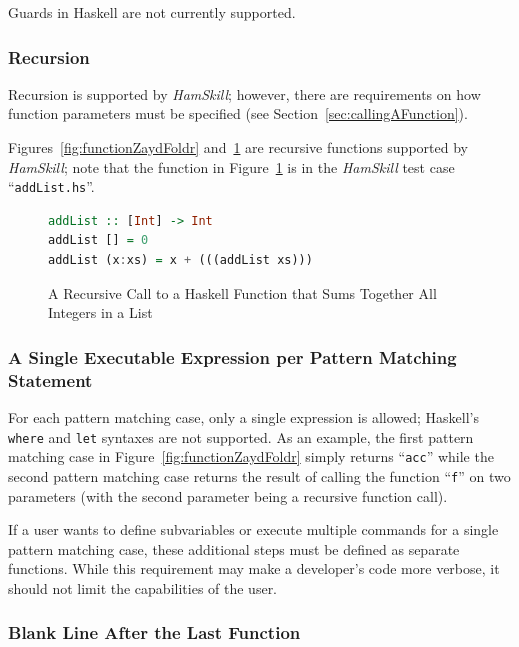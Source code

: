 \documentclass{report}
\begin{document}
Guards in Haskell are not currently supported.


\subsubsection{Recursion}

Recursion is supported by \textit{HamSkill}; however, there are requirements on how function parameters must be specified (see Section~\ref{sec:callingAFunction}).

Figures~\ref{fig:functionZaydFoldr} and~\ref{fig:functionAddList} are recursive functions supported by \textit{HamSkill}; note that the function in Figure~\ref{fig:functionAddList} is in the \textit{HamSkill} test case ``\texttt{addList.hs}''.

\begin{figure}[H]
\begin{mdframed}
\begin{lstlisting}[language=Haskell]
addList :: [Int] -> Int
addList [] = 0
addList (x:xs) = x + (((addList xs)))
\end{lstlisting}
\end{mdframed}
\caption{A Recursive Call to a Haskell Function that Sums Together All Integers in a List}\label{fig:functionAddList}
\end{figure}

\subsubsection{A Single Executable Expression per Pattern Matching Statement}

For each pattern matching case, only a single expression is allowed; Haskell's \texttt{where} and \texttt{let} syntaxes are not supported.  As an example, the first pattern matching case in Figure~\ref{fig:functionZaydFoldr} simply returns ``\texttt{acc}'' while the second pattern matching case returns the result of calling the function ``\texttt{f}'' on two parameters (with the second parameter being a recursive function call).

If a user wants to define subvariables or execute multiple commands for a single pattern matching case, these additional steps must be defined as separate functions.  While this requirement may make a developer's code more verbose, it should not limit the capabilities of the user.

\subsubsection{Blank Line After the Last Function}
\end{document}
